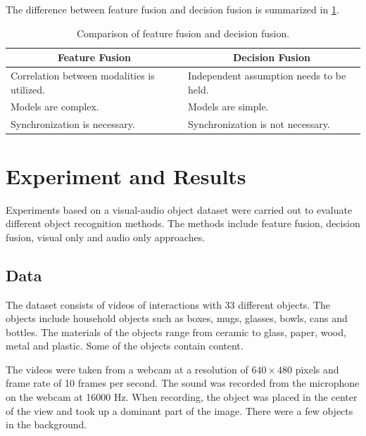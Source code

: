 \documentclass[letterpaper, 10 pt, conference]{ieeeconf}
\begin{document}
The difference between feature fusion and decision fusion is summarized in \cref{tab:fusion}.

\begin{table}[t]
  \caption{Comparison of feature fusion and decision fusion.}
  \label{tab:fusion}
  \centering
  \begin{tabular}{p{.42\linewidth}p{.42\linewidth}}
    \toprule
    \multicolumn{1}{c}{\bfseries Feature Fusion} & \multicolumn{1}{c}{\bfseries Decision Fusion} \\ \midrule
    Correlation between modalities is utilized. & Independent assumption needs to be held. \\
    Models are complex. & Models are simple. \\
    Synchronization is necessary. & Synchronization is not necessary. \\
    \bottomrule
  \end{tabular}
\end{table}

\section{Experiment and Results}
Experiments based on a visual-audio object dataset were carried out to evaluate different object recognition methods. The methods include feature fusion, decision fusion, visual only and audio only approaches.

\subsection{Data}
The dataset consists of videos of interactions with 33 different objects. The objects include household objects such as boxes, mugs, glasses, bowls, cans and bottles. The materials of the objects range from ceramic to glass, paper, wood, metal and plastic. Some of the objects contain content.

The videos were taken from a webcam at a resolution of $640 \times 480$ pixels and frame rate of 10 frames per second. The sound was recorded from the microphone on the webcam at 16000 Hz. When recording, the object was placed in the center of the view and took up a dominant part of the image. There were a few objects in the background.
\end{document}
